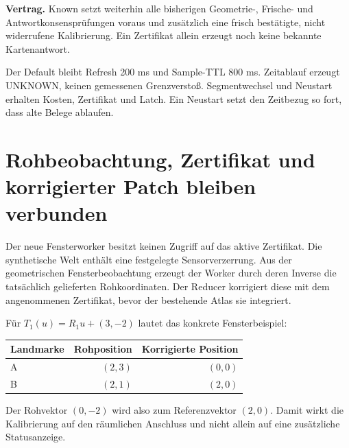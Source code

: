 \documentclass[11pt,a4paper]{article}
\newcommand{\contract}[1]{\vspace{3pt}\noindent\colorbox{pale}{\parbox{\dimexpr\linewidth-2\fboxsep}{\textbf{Vertrag.} #1}}\vspace{5pt}}
\newcommand{\nextsection}[2]{\clearpage{\color{accent}\small\textsf{#1}}\section{#2}}
\begin{document}
\contract{Known setzt weiterhin alle bisherigen Geometrie-,
Frische- und Antwortkonsensprüfungen voraus und zusätzlich eine
frisch bestätigte, nicht widerrufene Kalibrierung. Ein Zertifikat
allein erzeugt noch keine bekannte Kartenantwort.}

Der Default bleibt Refresh 200 ms und Sample-TTL 800 ms.
Zeitablauf erzeugt UNKNOWN, keinen gemessenen Grenzverstoß.
Segmentwechsel und Neustart erhalten Kosten, Zertifikat und Latch.
Ein Neustart setzt den Zeitbezug so fort, dass alte Belege ablaufen.

\nextsection{58 / KOORDINATENKORREKTUR}{Rohbeobachtung, Zertifikat und korrigierter Patch bleiben verbunden}
Der neue Fensterworker besitzt keinen Zugriff auf das aktive
Zertifikat. Die synthetische Welt enthält eine festgelegte
Sensorverzerrung. Aus der geometrischen Fensterbeobachtung erzeugt
der Worker durch deren Inverse die tatsächlich gelieferten
Rohkoordinaten. Der Reducer korrigiert diese mit dem angenommenen
Zertifikat, bevor der bestehende Atlas sie integriert.

\begin{center}
\end{center}

Für $T_1(u)=R_1u+(3,-2)$ lautet das konkrete Fensterbeispiel:
\begin{center}
\begin{tabular}{@{}lrr@{}}
\toprule
Landmarke & Rohposition & Korrigierte Position\\\midrule
A & $(2,3)$ & $(0,0)$\\
B & $(2,1)$ & $(2,0)$\\
\bottomrule
\end{tabular}
\end{center}
Der Rohvektor $(0,-2)$ wird also zum Referenzvektor $(2,0)$.
Damit wirkt die Kalibrierung auf den räumlichen Anschluss und
nicht allein auf eine zusätzliche Statusanzeige.
\end{document}
